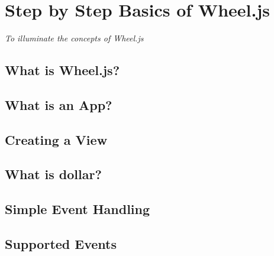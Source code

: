 \chapter{Step by Step Basics of Wheel.js}
\begin{center}
{\small\em To illuminate the concepts of Wheel.js}
\end{center}


\section{What is Wheel.js?} %
\label{sec:What is Wheel.js?}


\section{What is an App?} %
\label{sec:What is an App?}


\section{Creating a View} %
\label{sec:Creating a View}


\section{What is dollar?} %
\label{sec:What is dollar?}


\section{Simple Event Handling} %
\label{sec:Simple Event Handling}


\section{Supported Events} %
\label{sec:Supported Events}


